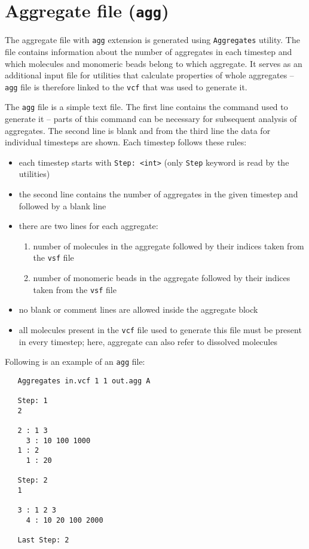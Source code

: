 \section{Aggregate file (\texttt{agg})} \label{sec:AggFile} %

The aggregate file with \texttt{agg} extension is generated using
\texttt{Aggregates} utility. The file
contains information about the number of aggregates in each timestep and
which molecules and monomeric beads belong to which aggregate. It serves as
an additional input file for utilities that calculate properties of whole
aggregates -- \texttt{agg} file is therefore linked to the \texttt{vcf}
that was used to generate it.

The \texttt{agg} file is a simple text file. The first line contains the
command used to generate it -- parts of this command can be necessary for
subsequent analysis of aggregates. The second line is blank and from the
third line the data for individual timesteps are shown. Each timestep
follows these rules:

\begin{itemize}[topsep=0pt,itemsep=0pt]
  \item each timestep starts with \texttt{Step: <int>} (only \texttt{Step}
    keyword is read by the utilities)
  \item the second line contains the number of aggregates in the given
    timestep and followed by a blank line
  \item there are two lines for each aggregate:
  \begin{enumerate}[topsep=0pt,itemsep=0pt]
    \item number of molecules in the aggregate followed by their indices
      taken from the \texttt{vsf} file
    \item number of monomeric beads in the aggregate followed by their
      indices taken from the \texttt{vsf} file
  \end{enumerate}
  \item no blank or comment lines are allowed inside the aggregate block
  \item all molecules present in the \texttt{vcf} file used to generate
    this file must be present in every timestep; here, aggregate can also
    refer to dissolved molecules
\end{itemize}

Following is an example of an \texttt{agg} file:

\begin{verbatim}
   Aggregates in.vcf 1 1 out.agg A

   Step: 1
   2

   2 : 1 3
     3 : 10 100 1000
   1 : 2
     1 : 20

   Step: 2
   1

   3 : 1 2 3
     4 : 10 20 100 2000

   Last Step: 2
\end{verbatim}

